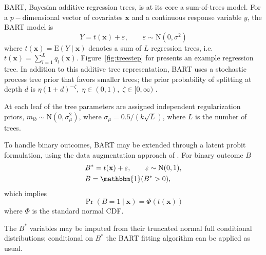 \documentclass[aoas,preprint, 11pt, dvipsnames, table, x11name]{imsart}
\newcommand{\E}{\mbox{E}}
\newcommand{\N}{\mbox{N}}
\renewcommand{\bm}[1]{\mathbf{#1}}
\theoremstyle{remark}
\begin{document}
	BART, Bayesian additive regression trees, is at its core a sum-of-trees model. For a $p-$dimensional vector of covariates $\bm{x}$ and a continuous response variable $y$, the BART model is 
	\begin{equation}
		Y=t(\bm{x})+\varepsilon, \qquad \varepsilon\sim \N(0, \sigma^2)
		\label{bart_setup}
	\end{equation}
	where $t(\bm{x})=\E(Y\mid \bm{x})$ denotes a sum of $L$ regression trees, i.e. $t(\bm{x})=\sum_{l=1}^{L} q_l(\bm{x})$. Figure~\ref{fig:treestep} for presents an example regression tree.  In addition to this additive tree representation, BART uses a stochastic process tree prior that favors smaller trees; the prior probability of splitting at depth $d$ is $\eta(1+d)^{-\zeta}, \; \eta\in (0,1), \; \zeta\in[0, \infty)$ \citep{Chipman-1998}.    
	
	At each leaf of the tree parameters are assigned independent regularization priors, $m_{lb}\sim  \N(0, \sigma_{\mu}^2)$, where $\sigma_{\mu}=0.5/(k\sqrt{L})$, where $L$ is the number of trees. 
	
	To handle binary outcomes, BART may be extended through a latent probit formulation, using the data augmentation approach of \cite{Albert-1993}. For binary outcome $B$ 
	\begin{align*}
		&B^*=t(\bm{x})+\varepsilon, \qquad \varepsilon\sim \N(0,1),\\
		&B=\mathbbm{1}(B^*>0),
	\end{align*}
	which implies
	\begin{equation}
		\Pr(B=1\mid \bm{x})=\Phi(t(\bm{x}))
		\label{bart_binary}
	\end{equation}
	where $\Phi$ is the standard normal CDF.  
	
	The $B^*$ variables may be imputed from their truncated normal full conditional distributions; conditional on $B^*$ the BART fitting algorithm can be applied as usual.
	
\end{document}
